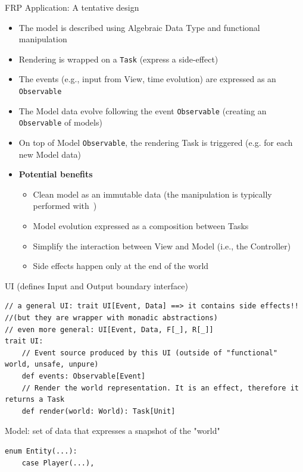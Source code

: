 \documentclass[presentation, 9pt]{beamer}\mode<presentation>{\usetheme{AMSBolognaFC}}
\begin{document}
\begin{frame}{FRP Application: A tentative design \href{https://github.com/cric96/scala-frp-gui}{\faLink}}
	\begin{itemize}
		\item The model is described using Algebraic Data Type and functional manipulation
		\item Rendering is wrapped on a \texttt{Task} (express a side-effect)
  	\item The events (e.g., input from View, time evolution) are expressed as an \texttt{Observable}
   	\item The Model data evolve following the event \texttt{Observable} (creating an \texttt{Observable} of models)
    \item On top of Model \texttt{Observable}, the rendering Task is triggered (e.g. for each new Model data)
		\item \textbf{Potential benefits}
		\begin{itemize}
			\item Clean model as an immutable data (the manipulation is typically performed with \href{https://www.optics.dev/Monocle/}{\faLink} \,)
   		\item Model evolution expressed as a composition between Tasks  
			\item Simplify the interaction between View and Model (i.e., the Controller)
   		\item Side effects happen only at the end of the world
		\end{itemize}
	\end{itemize}
	\begin{alertblock}{UI (defines Input and Output boundary interface)}
	\begin{tcolorbox}[left=0pt, top=0pt, bottom=0pt]
		\begin{verbatim}
// a general UI: trait UI[Event, Data] ==> it contains side effects!! 
//(but they are wrapper with monadic abstractions)
// even more general: UI[Event, Data, F[_], R[_]]
trait UI:
	// Event source produced by this UI (outside of "functional" world, unsafe, unpure)
	def events: Observable[Event]
	// Render the world representation. It is an effect, therefore it returns a Task
	def render(world: World): Task[Unit]
		\end{verbatim}
		\end{tcolorbox}
	\end{alertblock}
	\begin{alertblock}{Model: set of data that expresses a snapshot of the "world"}
		\begin{tcolorbox}[left=0pt, top=0pt, bottom=0pt]
			\begin{verbatim}
enum Entity(...):
	case Player(...),


\end{verbatim}
\end{tcolorbox}
\end{alertblock}
\end{frame}
\end{document}
